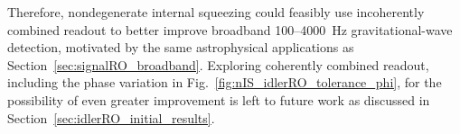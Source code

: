 Therefore, nondegenerate internal squeezing could feasibly use incoherently combined readout to better improve broadband 100--4000~Hz  gravitational-wave detection, motivated by the same astrophysical applications as Section~\ref{sec:signalRO_broadband}. %
Exploring coherently combined readout, including the phase variation in Fig.~\ref{fig:nIS_idlerRO_tolerance_phi}, for the possibility of even greater improvement is left to future work as discussed in Section~\ref{sec:idlerRO_initial_results}. %



